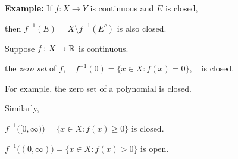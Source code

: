 \documentclass[10pt,aspectratio=169]{beamer}
\begin{document}
\begin{frame}

\textbf{Example:}
If $f \colon X \to Y$ is continuous and $E$ is closed,

\pause
then $f^{-1}(E) = X \setminus f^{-1}(E^c)$ is also closed.

\pause
\medskip

Suppose 
$f \colon X \to {\mathbb{R}}$ is continuous.

\pause
\medskip

\thus \quad
the 
\emph{zero set} of $f$, ~
$f^{-1}(0) = \bigl\{ x \in X : f(x) = 0 \bigr\}$, ~
is closed.

\pause
\medskip

For example, the zero set of a polynomial is closed.

\pause
\medskip

Similarly, 

\medskip

$f^{-1}\bigl( [0,\infty) \bigr) = \bigl\{ x \in X : f(x) \geq 0 \bigr\}$
is closed.

\pause
\medskip

$f^{-1}\bigl( (0,\infty) \bigr) = \bigl\{ x \in X : f(x) > 0 \bigr\}$
is open.  

\end{frame}
\end{document}
